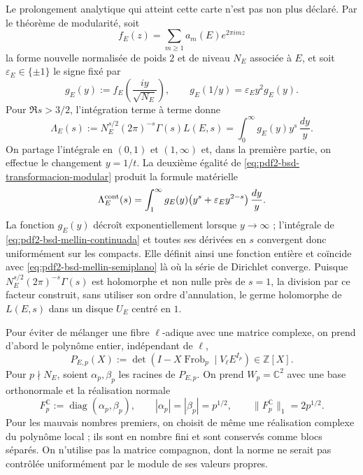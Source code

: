Le prolongement analytique qui atteint cette carte n'est pas non plus déclaré. Par le
théorème de modularité, soit
\[
 f_E(z)=\sum_{m\geq1}a_m(E)e^{2\pi imz}
\]
la forme nouvelle normalisée de poids $2$ et de niveau $N_E$ associée à $E$, et soit
$\varepsilon_E\in\{\pm1\}$ le signe fixé par
\begin{equation}\label{eq:pdf2-bsd-transformacion-modular}
 g_E(y):=f_E\!\left(\frac{iy}{\sqrt{N_E}}\right),
 \qquad
 g_E(1/y)=\varepsilon_Ey^2g_E(y).
\end{equation}
Pour $\Re s>3/2$, l'intégration terme à terme donne
\begin{equation}\label{eq:pdf2-bsd-mellin-semiplano}
 \Lambda_E(s):=N_E^{s/2}(2\pi)^{-s}\Gamma(s)L(E,s)
 =\int_0^\infty g_E(y)y^s\,\frac{dy}{y}.
\end{equation}
On partage l'intégrale en $(0,1)$ et $(1,\infty)$ et, dans la première partie, on
effectue le changement $y=1/t$. La deuxième égalité de
\eqref{eq:pdf2-bsd-transformacion-modular} produit la formule matérielle
\begin{equation}\label{eq:pdf2-bsd-mellin-continuada}
 \Lambda_E^{\rm cont}(s)=
 \int_1^\infty g_E(y)
       \bigl(y^s+\varepsilon_Ey^{2-s}\bigr)\,\frac{dy}{y}.
\end{equation}
La fonction $g_E(y)$ décroît exponentiellement lorsque $y\to\infty$ ;
l'intégrale de \eqref{eq:pdf2-bsd-mellin-continuada} et toutes ses dérivées en
$s$ convergent donc uniformément sur les compacts. Elle définit ainsi une fonction entière et
coïncide avec \eqref{eq:pdf2-bsd-mellin-semiplano} là où la série de Dirichlet
converge. Puisque
$N_E^{s/2}(2\pi)^{-s}\Gamma(s)$ est holomorphe et non nulle près de $s=1$, la
division par ce facteur construit, sans utiliser son ordre d'annulation, le germe
holomorphe de $L(E,s)$ dans un disque $U_E$ centré en $1$.

Pour éviter de mélanger une fibre $\ell$-adique avec une matrice complexe, on prend
d'abord le polynôme entier, indépendant de $\ell$,
\begin{equation}\label{eq:pdf2-bsd-polinomio-local-entero}
 P_{E,p}(X):=\det(I-X\operatorname{Frob}_p\mid V_\ell E^{I_p})
 \in\mathbb Z[X].
\end{equation}
Pour $p\nmid N_E$, soient $\alpha_p,\beta_p$ les racines de $P_{E,p}$. On prend
$W_p=\mathbb C^2$ avec une base orthonormale et la réalisation normale
\begin{equation}\label{eq:pdf2-bsd-realizacion-normal-frobenius}
 F_p^{\mathbb C}:=\operatorname{diag}(\alpha_p,\beta_p),
 \qquad |\alpha_p|=|\beta_p|=p^{1/2},
 \qquad \|F_p^{\mathbb C}\|_1=2p^{1/2}.
\end{equation}
Pour les mauvais nombres premiers, on choisit de même une réalisation complexe du
polynôme local ; ils sont en nombre fini et sont conservés comme blocs séparés. On n'utilise pas
la matrice compagnon, dont la norme ne serait pas contrôlée uniformément par le
module de ses valeurs propres.

